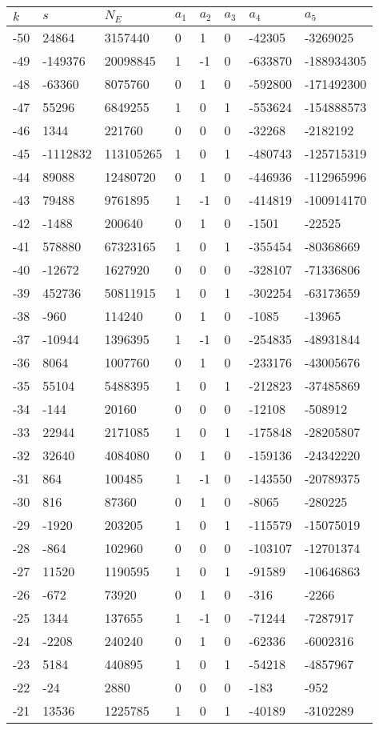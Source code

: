 \documentclass{amsart}
\begin{document}
\begin{longtable}{|l|l|l|lllll|}
\hline
$k$ & $s$ & $N_E$ & $a_1$ & $a_2$ & $a_3$ & $a_4$ & $a_5$\\
\hline
-50&24864&3157440&0&1&0&-42305&-3269025\\
-49&-149376&20098845&1&-1&0&-633870&-188934305\\
-48&-63360&8075760&0&1&0&-592800&-171492300\\
-47&55296&6849255&1&0&1&-553624&-154888573\\
-46&1344&221760&0&0&0&-32268&-2182192\\
-45&-1112832&113105265&1&0&1&-480743&-125715319\\
-44&89088&12480720&0&1&0&-446936&-112965996\\
-43&79488&9761895&1&-1&0&-414819&-100914170\\
-42&-1488&200640&0&1&0&-1501&-22525\\
-41&578880&67323165&1&0&1&-355454&-80368669\\
-40&-12672&1627920&0&0&0&-328107&-71336806\\
-39&452736&50811915&1&0&1&-302254&-63173659\\
-38&-960&114240&0&1&0&-1085&-13965\\
-37&-10944&1396395&1&-1&0&-254835&-48931844\\
-36&8064&1007760&0&1&0&-233176&-43005676\\
-35&55104&5488395&1&0&1&-212823&-37485869\\
-34&-144&20160&0&0&0&-12108&-508912\\
-33&22944&2171085&1&0&1&-175848&-28205807\\
-32&32640&4084080&0&1&0&-159136&-24342220\\
-31&864&100485&1&-1&0&-143550&-20789375\\
-30&816&87360&0&1&0&-8065&-280225\\
-29&-1920&203205&1&0&1&-115579&-15075019\\
-28&-864&102960&0&0&0&-103107&-12701374\\
-27&11520&1190595&1&0&1&-91589&-10646863\\
-26&-672&73920&0&1&0&-316&-2266\\
-25&1344&137655&1&-1&0&-71244&-7287917\\
-24&-2208&240240&0&1&0&-62336&-6002316\\
-23&5184&440895&1&0&1&-54218&-4857967\\
-22&-24&2880&0&0&0&-183&-952\\
-21&13536&1225785&1&0&1&-40189&-3102289\\

\end{longtable}
\end{document}
